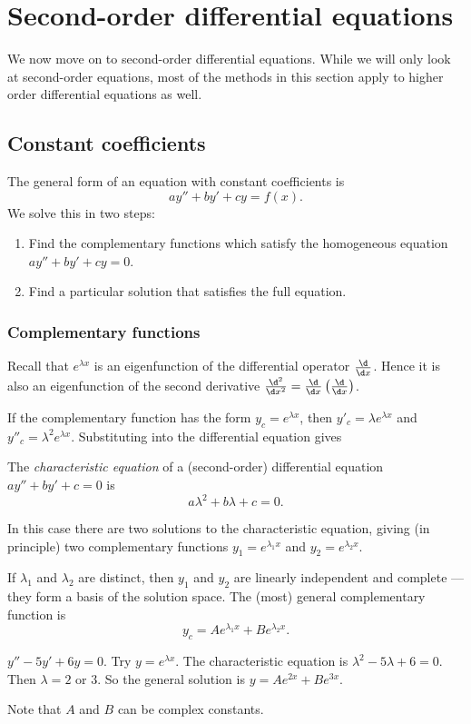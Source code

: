 \documentclass[a4paper]{article}
\begin{document}
\section{Second-order differential equations}
We now move on to second-order differential equations. While we will only look at second-order equations, most of the methods in this section apply to higher order differential equations as well.
\subsection{Constant coefficients}
The general form of an equation with constant coefficients is
\[
  ay'' + by' + cy = f(x).
\]
We solve this in two steps:
\begin{enumerate}
  \item Find the complementary functions which satisfy the homogeneous equation $ay'' + by' + cy = 0$.
  \item Find a particular solution that satisfies the full equation.
\end{enumerate}
\subsubsection{Complementary functions}
Recall that $e^{\lambda x}$ is an eigenfunction of the differential operator $\frac{\d}{\d x}$. Hence it is also an eigenfunction of the second derivative $\frac{\d^2}{\d x^2} = \frac{\d}{\d x}\left(\frac{\d }{\d x}\right)$.

If the complementary function has the form $y_c = e^{\lambda x}$, then $y'_c = \lambda e^{\lambda x}$ and $y''_c = \lambda^2 e^{\lambda x}$. Substituting into the differential equation gives
\begin{defi}
  The \emph{characteristic equation} of a (second-order) differential equation $ay'' + by' + c = 0$ is
  \[
    a\lambda^2 + b\lambda + c = 0.
  \]
\end{defi}

In this case there are two solutions to the characteristic equation, giving (in principle) two complementary functions $y_1 = e^{\lambda_1 x}$ and $y_2 = e^{\lambda_2 x}$.

If $\lambda_1$ and $\lambda_2$ are distinct, then $y_1$ and $y_2$ are linearly independent and complete --- they form a basis of the solution space. The (most) general complementary function is
\[
  y_c = Ae^{\lambda_1 x} + Be^{\lambda_2 x}.
\]
\begin{eg}
  $y'' - 5y' + 6y = 0$. Try $y = e^{\lambda x}$. The characteristic equation is $\lambda^2 - 5\lambda + 6 = 0$. Then $\lambda = 2$ or $3$. So the general solution is $y = Ae^{2x} + Be^{3x}$.

  Note that $A$ and $B$ can be complex constants.
\end{eg}
\end{document}
